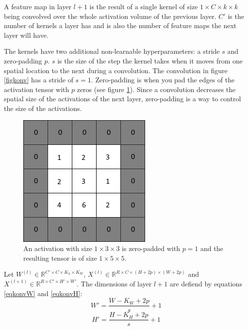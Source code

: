 \documentclass[a4paper,11pt,twoside]{article}
\begin{document}
A feature map in layer $l+1$ is the result of a single kernel of size $1 \times C  \times k\times k$ being convolved over the whole activation volume of the previous layer. $C'$ is the number of kernels a layer has and is also the number of feature maps the next layer will have. \cite{cs231n} \cite{convmath}

The kernels have two additional non-learnable hyperparameters: a stride $s$ and zero-padding $p$. $s$ is the size of the step the kernel takes when it moves from one spatial location to the next during a convolution. The convolution in figure \ref{figkonv} has a stride of $s = 1$. Zero-padding is when you pad the edges of the activation tensor with $p$ zeros (see figure \ref{figzeropad}). Since a convolution decreases the spatial size of the activations of the next layer, zero-padding is a way to control the size of the activations. \cite{cs231n} \cite{convmath} \cite{convarithmetic}

\begin{figure}[h]
	\centering
  		\includegraphics[scale=0.7]{zeropadding.png}
  	\caption{An activation with size $1 \times 3 \times 3$ is zero-padded with $p=1$ and the resulting tensor is of size $1 \times 5 \times 5$.} \label{figzeropad}
\end{figure}

Let $W^{(l)} \in \mathbb{R}^{C' \times C  \times K_h \times K_W}$, $X^{(l)} \in \mathbb{R}^{R \times C  \times (H+2p) \times (W+2p)}$ and $X^{(l+1)} \in \mathbb{R}^{R \times C'  \times H' \times W'}$. The dimensions of layer $l+1$ are defiend by equations \eqref{eqkonvW} and \eqref{eqkonvH}: \cite{cs231n} \cite{convmath} \cite{convarithmetic}
\begin{equation}\label{eqkonvW}
W' = \frac{W-K_W+2p}{s} +1
\end{equation}
\begin{equation}\label{eqkonvH}
H' = \frac{H-K_H+2p}{s} +1
\end{equation}
\end{document}
